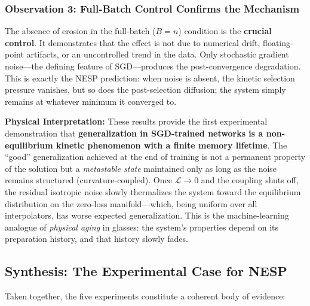 \documentclass[
  journal=largetwo,
  year=2025,
  volume=37,
]{cup-journal}
\begin{document}
\subsubsection{Observation 3: Full-Batch Control Confirms the Mechanism}

The absence of erosion in the full-batch ($B=n$) condition is the \textbf{crucial control}. It demonstrates that the effect is not due to numerical drift, floating-point artifacts, or an uncontrolled trend in the data. Only stochastic gradient noise---the defining feature of SGD---produces the post-convergence degradation. This is exactly the NESP prediction: when noise is absent, the kinetic selection pressure vanishes, but so does the post-selection diffusion; the system simply remains at whatever minimum it converged to.

\textbf{Physical Interpretation:} These results provide the first experimental demonstration that \textbf{generalization in SGD-trained networks is a non-equilibrium kinetic phenomenon with a finite memory lifetime}. The ``good'' generalization achieved at the end of training is not a permanent property of the solution but a \textit{metastable state} maintained only as long as the noise remains structured (curvature-coupled). Once $\mathcal{L} \to 0$ and the coupling shuts off, the residual isotropic noise slowly thermalizes the system toward the equilibrium distribution on the zero-loss manifold---which, being uniform over all interpolators, has worse expected generalization. This is the machine-learning analogue of \textit{physical aging} in glasses: the system's properties depend on its preparation history, and that history slowly fades.

\subsection{Synthesis: The Experimental Case for NESP}

Taken together, the five experiments constitute a coherent body of evidence:
\end{document}
